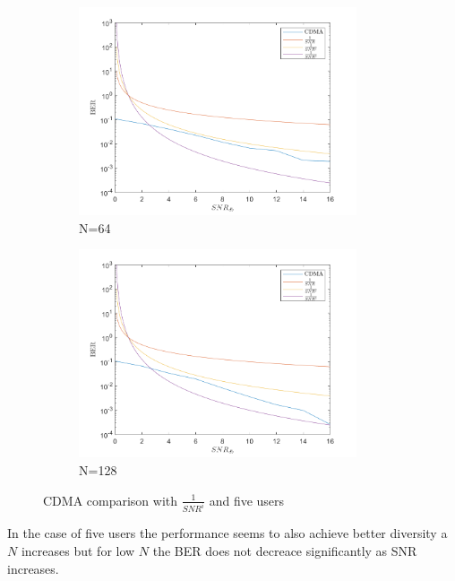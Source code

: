 \documentclass[12pt]{article}
\begin{document}
\begin{enumerate}
\begin{enumerate}
\begin{enumerate}
\begin{figure}[h!]
\begin{subfigure}[b]{0.4\textwidth}
									\includegraphics[width=0.9\textwidth]{fig9.png}
									\caption{N=64}
								\end{subfigure}
								\begin{subfigure}[b]{0.4\textwidth}
									\centering
									\includegraphics[width=0.9\textwidth]{fig10.png}
									\caption{N=128}
								\end{subfigure}
								\caption{CDMA comparison with $\frac{1}{SNR^i}$ and five users}
							\end{figure}
						
							In the case of five users the performance seems to also achieve better diversity a $N$ increases but for low $N$ the BER does not decreace significantly as SNR increases. 
					\end{enumerate}
			\end{enumerate}
		

\end{enumerate}
\end{document}
